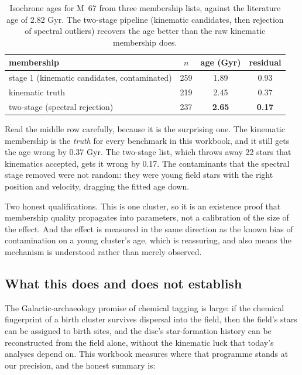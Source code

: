 \begin{table}[htbp]
\centering
\small
{}
\begin{tabular}{@{}lccc@{}}
\toprule
membership & $n$ & age (Gyr) & residual \\
\midrule
stage 1 (kinematic candidates, contaminated) & 259 & 1.89 & 0.93 \\
kinematic truth                              & 219 & 2.45 & 0.37 \\
two-stage (spectral rejection)               & 237 & \textbf{2.65} & \textbf{0.17} \\
\bottomrule
\end{tabular}
\caption{Isochrone ages for M~67 from three membership lists, against the
literature age of 2.82 Gyr. The two-stage pipeline (kinematic candidates, then
rejection of spectral outliers) recovers the age better than the raw kinematic
membership does.}
\label{tab:m67}
\end{table}

Read the middle row carefully, because it is the surprising one. The kinematic
membership is the \emph{truth} for every benchmark in this workbook, and it
still gets the age wrong by 0.37 Gyr. The two-stage list, which throws away 22
stars that kinematics accepted, gets it wrong by 0.17. The contaminants that
the spectral stage removed were not random: they were young field stars with
the right position and velocity, dragging the fitted age down.

Two honest qualifications. This is one cluster, so it is an existence proof
that membership quality propagates into parameters, not a calibration of the
size of the effect. And the effect is measured in the same direction as the
known bias of contamination on a young cluster's age, which is reassuring, and
also means the mechanism is understood rather than merely observed.

\subsection{What this does and does not establish}

The Galactic-archaeology promise of chemical tagging is large: if the chemical
fingerprint of a birth cluster survives dispersal into the field, then the
field's stars can be assigned to birth sites, and the disc's star-formation
history can be reconstructed from the field alone, without the kinematic
luck that today's analyses depend on. This workbook measures where that
programme stands at our precision, and the honest summary is:


